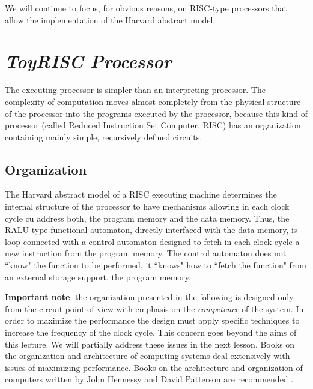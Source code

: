 We will continue to focus, for obvious reasons, on RISC-type processors that allow the implementation of the Harvard abstract model.

\section{{\bf {\em ToyRISC Processor}}}

The executing processor is simpler than an interpreting processor.
The complexity of computation moves almost completely from the
physical structure of the processor into the programs executed by
the processor, because this kind of processor (called Reduced Instruction Set Computer, RISC)  has an organization
containing mainly simple, recursively defined circuits.


\subsection{Organization}

The Harvard abstract model of a RISC executing machine  determines the internal structure of the
processor to have mechanisms allowing in each clock cycle cu
address both, the program memory and the data memory. Thus, the
RALU-type functional automaton, directly interfaced with the data
memory, is loop-connected with a control automaton designed to
fetch in each clock cycle a new instruction from the program
memory. The control automaton does not ``know" the function to be
performed, it ``knows" how to ``fetch the function" from an external storage
support, the program memory.


{\bf Important note}: the organization presented in the following is designed only from the circuit point of view with emphasis on the {\em competence} of the system. In order to maximize the performance the design must apply specific techniques to increase the frequency of the clock cycle. This concern goes beyond the aims of this lecture. We will partially address these issues in the next lesson. Books on the organization and architecture of computing systems deal extensively with issues of maximizing performance. Books on the architecture and organization of computers written by John Hennessy and David Patterson are recommended  \citep{Hennessy19, Patterson19}.


